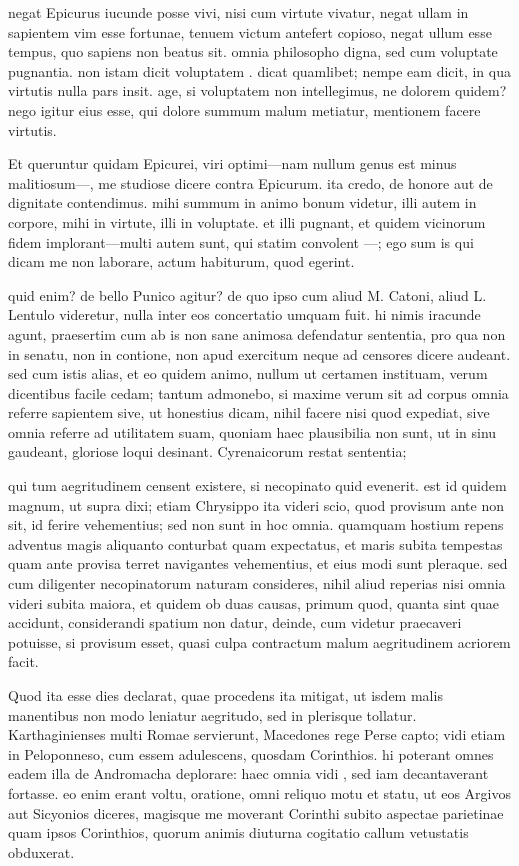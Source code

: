  negat Epicurus iucunde posse vivi, nisi cum virtute vivatur, negat ullam in sapientem vim esse fortunae, tenuem victum antefert copioso, negat ullum esse tempus, quo sapiens non beatus sit. omnia philosopho digna, sed cum voluptate pugnantia. non istam dicit voluptatem . dicat quamlibet; nempe eam dicit, in qua virtutis nulla pars insit. age, si voluptatem non intellegimus, ne dolorem quidem? nego igitur eius esse, qui dolore summum malum metiatur, mentionem facere virtutis.

 Et queruntur quidam Epicurei, viri optimi—nam nullum genus est minus malitiosum—, me studiose dicere contra Epicurum. ita credo, de honore aut de dignitate contendimus. mihi summum in animo bonum videtur, illi autem in corpore, mihi in virtute, illi in voluptate. et illi pugnant, et quidem vicinorum fidem implorant—multi autem sunt, qui statim convolent —; ego sum is qui dicam me non laborare, actum habiturum, quod egerint.

 quid enim? de bello Punico agitur? de quo ipso cum aliud M. Catoni, aliud L. Lentulo videretur, nulla inter eos concertatio umquam fuit. hi nimis iracunde agunt, praesertim cum ab is non sane animosa defendatur sententia, pro qua non in senatu, non in contione, non apud exercitum neque ad censores dicere audeant. sed cum istis alias, et eo quidem animo, nullum ut certamen instituam, verum dicentibus facile cedam; tantum admonebo, si maxime verum sit ad corpus omnia referre sapientem sive, ut honestius dicam, nihil facere nisi quod expediat, sive omnia referre ad utilitatem suam, quoniam haec plausibilia non sunt, ut in sinu gaudeant, gloriose loqui desinant. Cyrenaicorum restat sententia;

 qui tum aegritudinem censent existere, si necopinato quid evenerit. est id quidem magnum, ut supra dixi; etiam Chrysippo ita videri scio, quod provisum ante non sit, id ferire vehementius; sed non sunt in hoc omnia. quamquam hostium repens adventus magis aliquanto conturbat quam expectatus, et maris subita tempestas quam ante provisa terret navigantes vehementius, et eius modi sunt pleraque. sed cum diligenter necopinatorum naturam consideres, nihil aliud reperias nisi omnia videri subita maiora, et quidem ob duas causas, primum quod, quanta sint quae accidunt, considerandi spatium non datur, deinde, cum videtur praecaveri potuisse, si provisum esset, quasi culpa contractum malum aegritudinem acriorem facit.

 Quod ita esse dies declarat, quae procedens ita mitigat, ut isdem malis manentibus non modo leniatur aegritudo, sed in plerisque tollatur. Karthaginienses multi Romae servierunt, Macedones rege Perse capto; vidi etiam in Peloponneso, cum essem adulescens, quosdam Corinthios. hi poterant omnes eadem illa de Andromacha deplorare: haec omnia vidi , sed iam decantaverant fortasse. eo enim erant voltu, oratione, omni reliquo motu et statu, ut eos Argivos aut Sicyonios diceres, magisque me moverant Corinthi subito aspectae parietinae quam ipsos Corinthios, quorum animis diuturna cogitatio callum vetustatis obduxerat.

